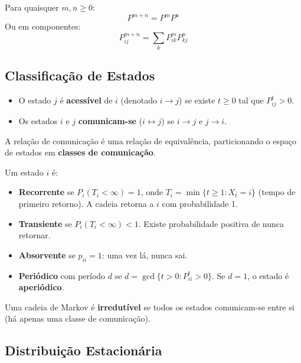 \documentclass{tufte-handout}
\begin{document}
\begin{prop}
    Para quaisquer $m, n \ge 0$:
    \[
    P^{m+n} = P^m P^n
    \]
    Ou em componentes:
    \[
    P^{m+n}_{ij} = \sum_{k} P^m_{ik} P^n_{kj}
    \]
\end{prop}

\subsection{Classificação de Estados}

\begin{defn}
    \begin{itemize}
        \item O estado $j$ é \textbf{acessível} de $i$ (denotado $i \to j$) se existe $t \ge 0$
        tal que $P^t_{ij} > 0$.
        \item Os estados $i$ e $j$ \textbf{comunicam-se} ($i \leftrightarrow j$) se $i \to j$
        e $j \to i$.
    \end{itemize}
    A relação de comunicação é uma relação de equivalência, particionando o espaço de
    estados em \textbf{classes de comunicação}.
\end{defn}

\begin{defn}[Classificação]
    Um estado $i$ é:
    \begin{itemize}
        \item \textbf{Recorrente} se $P_i(T_i < \infty) = 1$, onde $T_i = \min\{t \ge 1 : X_t = i\}$
        (tempo de primeiro retorno). A cadeia retorna a $i$ com probabilidade 1.
        \item \textbf{Transiente} se $P_i(T_i < \infty) < 1$. Existe probabilidade positiva
        de nunca retornar.
        \item \textbf{Absorvente} se $p_{ii} = 1$: uma vez lá, nunca sai.
        \item \textbf{Periódico} com período $d$ se $d = \gcd\{t > 0 : P^t_{ii} > 0\}$.
        Se $d = 1$, o estado é \textbf{aperiódico}.
    \end{itemize}
\end{defn}

\begin{defn}[Irredutibilidade]
    Uma cadeia de Markov é \textbf{irredutível} se todos os estados comunicam-se entre si
    (há apenas uma classe de comunicação).
\end{defn}

\subsection{Distribuição Estacionária}
\end{document}
